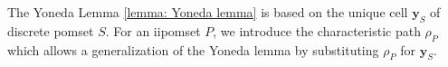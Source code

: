 \documentclass[11pt,a4paper,oldfontcommands]{memoir}
\newcommand*\subid[3]{{}_{#1}#2_{#3}}
\newcommand*\jneda{\mathbf{j}}
\begin{document}
The Yoneda Lemma \ref{lemma: Yoneda lemma} is based on the unique cell $\mathbf{y}_S$ of discrete pomset $S$. For an iipomset $P$, we introduce the characteristic path $\rho_P$ which allows a generalization of the Yoneda lemma by substituting $\rho_P$ for $\mathbf{y}_S$. 
\end{document}
